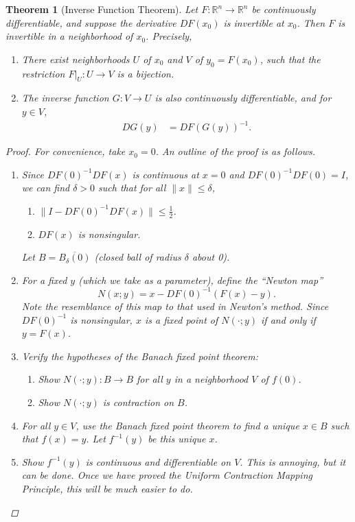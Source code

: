 \documentclass[12pt]{amsart}         %
\newtheorem{theorem}{Theorem}[section]
\theoremstyle{remark}
\newcommand{\R}{\mathbb{R}}
\begin{document}
\begin{theorem}[Inverse Function Theorem]
Let $F: \R^n \rightarrow \R^n$ be continuously differentiable, and suppose the derivative $DF(x_0)$ is invertible at $x_0$. Then $F$ is invertible in a neighborhood of $x_0$. Precisely,

\begin{enumerate}
\item There exist neighborhoods $U$ of $x_0$ and $V$ of $y_0 = F(x_0)$, such that the restriction $F|_U: U \rightarrow V$ is a bijection.
\item The inverse function $G: V \rightarrow U$ is also continuously differentiable, and for $y \in V$,
\begin{align*}
DG(y) &= DF(G(y))^{-1}.
\end{align*}
\end{enumerate}
\begin{proof}
For convenience, take $x_0 = 0$. An outline of the proof is as follows.
\begin{enumerate}
    \item Since $DF(0)^{-1} DF(x)$ is continuous at $x = 0$ and $DF(0)^{-1} DF(0) = I$, we can find $\delta > 0$ such that for all $\|x\| \leq \delta$,
    \begin{enumerate}
    \item $\|I - DF(0)^{-1} DF(x)\| \leq \frac{1}{2}$.
    \item $DF(x)$ is nonsingular.
    \end{enumerate}
    Let $B = \overline{ B_\delta(0) }$ (closed ball of radius $\delta$ about 0).

    \item For a fixed $y$ (which we take as a parameter), define the ``Newton map'' 
    \begin{equation*}
    N(x; y) = x - DF(0)^{-1}(F(x) - y).
    \end{equation*}
    Note the resemblance of this map to that used in Newton's method. Since $DF(0)^{-1}$ is nonsingular, $x$ is a fixed point of $N(\cdot; y)$ if and only if $y = F(x)$.

    \item Verify the hypotheses of the Banach fixed point theorem:
    \begin{enumerate}
    \item Show $N(\cdot; y): B \rightarrow B$ for all $y$ in a neighborhood $V$ of $f(0)$.
    \item Show $N(\cdot; y)$ is contraction on $B$.   
    \end{enumerate}
    
    \item For all $y \in V$, use the Banach fixed point theorem to find a unique $x \in B$ such that $f(x) = y$. Let $f^{-1}(y)$ be this unique $x$.
    
    \item Show $f^{-1}(y)$ is continuous and differentiable on $V$. This is annoying, but it can be done. Once we have proved the Uniform Contraction Mapping Principle, this will be much easier to do.
\end{enumerate}
\end{proof}
\end{theorem}
\end{document}
